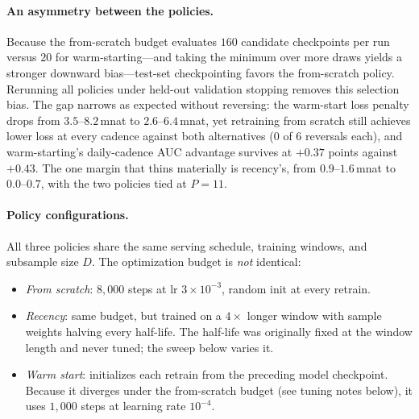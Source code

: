 \documentclass[10pt,letterpaper]{article}
\begin{document}
\paragraph{An asymmetry between the policies.}
Because the from-scratch budget evaluates $160$ candidate checkpoints per run
versus $20$ for warm-starting---and taking the minimum over more draws yields a
stronger downward bias---test-set checkpointing favors the from-scratch policy.
Rerunning all policies under held-out validation stopping removes this
selection bias. The gap narrows as expected without reversing: the warm-start
loss penalty drops from $3.5$--$8.2$\,mnat to $2.6$--$6.4$\,mnat, yet
retraining from scratch still achieves lower loss at every cadence against both
alternatives ($0$ of $6$ reversals each), and warm-starting's daily-cadence AUC
advantage survives at $+0.37$ points against $+0.43$. The one margin that thins
materially is recency's, from $0.9$--$1.6$\,mnat to $0.0$--$0.7$, with the two
policies tied at $P = 11$.

\paragraph{Policy configurations.}
All three policies share the same serving schedule, training windows, and
subsample size $D$. The optimization budget is \emph{not} identical:

\begin{itemize}
\item \emph{From scratch}: $8{,}000$ steps at lr $3\times10^{-3}$, random
      init at every retrain.
\item \emph{Recency}: same budget, but trained on a $4\times$ longer window
      with sample weights halving every half-life. The half-life was
      originally fixed at the window length and never tuned; the sweep below
      varies it.
\item \emph{Warm start}: initializes each retrain from the preceding model
      checkpoint. Because it diverges under the from-scratch budget (see tuning
      notes below), it uses $1{,}000$ steps at learning rate $10^{-4}$.
\end{itemize}
\end{document}
